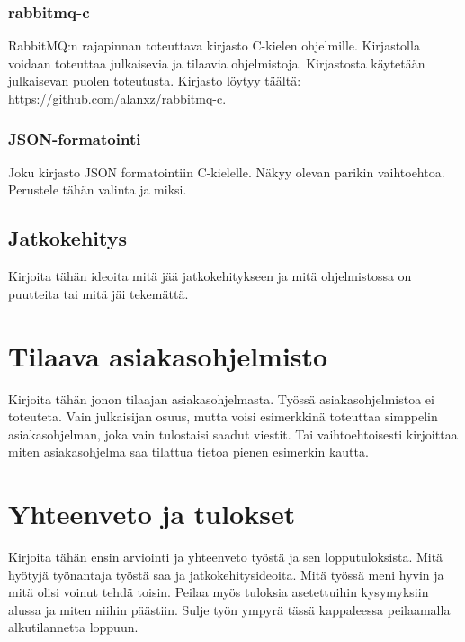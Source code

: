 \documentclass[globalnumbering,centeredcaptions,draftfooter]{tutthesis} %
\newif\ifnameyear
\begin{document}
\subsection{rabbitmq-c}
RabbitMQ:n rajapinnan toteuttava kirjasto C-kielen ohjelmille. Kirjastolla voidaan toteuttaa julkaisevia ja tilaavia ohjelmistoja. Kirjastosta käytetään julkaisevan puolen toteutusta. Kirjasto löytyy täältä: https://github.com/alanxz/rabbitmq-c.

\subsection{JSON-formatointi}
Joku kirjasto JSON formatointiin C-kielelle. Näkyy olevan parikin vaihtoehtoa. Perustele tähän valinta ja miksi.

\section{Jatkokehitys}
Kirjoita tähän ideoita mitä jää jatkokehitykseen ja mitä ohjelmistossa on puutteita tai mitä jäi tekemättä.


\chapter{Tilaava asiakasohjelmisto}
\label{ch:tilaava asiakasohjelmisto}
Kirjoita tähän jonon tilaajan asiakasohjelmasta. Työssä asiakasohjelmistoa ei toteuteta. Vain julkaisijan osuus, mutta voisi esimerkkinä toteuttaa simppelin asiakasohjelman, joka vain tulostaisi saadut viestit. Tai vaihtoehtoisesti kirjoittaa miten asiakasohjelma saa tilattua tietoa pienen esimerkin kautta.


\chapter{Yhteenveto ja tulokset}
\label{ch:yhteenveto ja tulokset}
Kirjoita tähän ensin arviointi ja yhteenveto työstä ja sen lopputuloksista. Mitä hyötyjä työnantaja työstä saa ja jatkokehitysideoita. Mitä työssä meni hyvin ja mitä olisi voinut tehdä toisin. Peilaa myös tuloksia asetettuihin kysymyksiin alussa ja miten niihin päästiin. Sulje työn ympyrä tässä kappaleessa peilaamalla alkutilannetta loppuun.





\addto\extrasenglish{\btxifchangecaseoff} %

\ifnameyear
  
\else
  
\fi



\appendix

\end{document}

